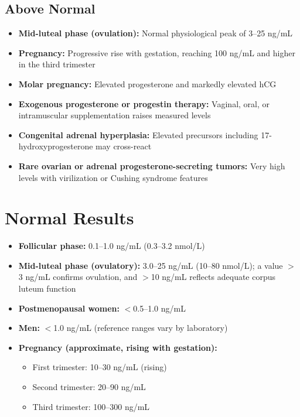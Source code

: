 \subsection*{Above Normal}
\begin{itemize}
  \item \textbf{Mid-luteal phase (ovulation):} Normal physiological peak of 3--25 ng/mL
  \item \textbf{Pregnancy:} Progressive rise with gestation, reaching 100 ng/mL and higher in the third trimester
  \item \textbf{Molar pregnancy:} Elevated progesterone and markedly elevated hCG
  \item \textbf{Exogenous progesterone or progestin therapy:} Vaginal, oral, or intramuscular supplementation raises measured levels
  \item \textbf{Congenital adrenal hyperplasia:} Elevated precursors including 17-hydroxyprogesterone may cross-react
  \item \textbf{Rare ovarian or adrenal progesterone-secreting tumors:} Very high levels with virilization or Cushing syndrome features
\end{itemize}

\section*{Normal Results}
\begin{itemize}
  \item \textbf{Follicular phase:} 0.1--1.0 ng/mL (0.3--3.2 nmol/L)
  \item \textbf{Mid-luteal phase (ovulatory):} 3.0--25 ng/mL (10--80 nmol/L); a value $>$3 ng/mL confirms ovulation, and $>$10 ng/mL reflects adequate corpus luteum function
  \item \textbf{Postmenopausal women:} $<$0.5--1.0 ng/mL
  \item \textbf{Men:} $<$1.0 ng/mL (reference ranges vary by laboratory)
  \item \textbf{Pregnancy (approximate, rising with gestation):}
  \begin{itemize}
    \item First trimester: 10--30 ng/mL (rising)
    \item Second trimester: 20--90 ng/mL
    \item Third trimester: 100--300 ng/mL
  \end{itemize}
\end{itemize}

